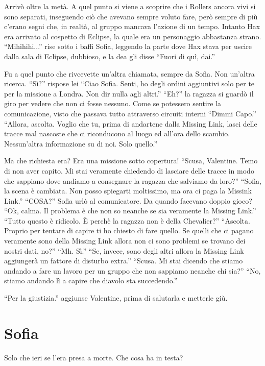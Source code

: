     Arrivò oltre la metà. A quel punto si viene a scoprire che i Rollers ancora vivi si sono separati, inseguendo ciò
    che avevano sempre voluto fare, però sempre di più c'erano segni che, in realtà, al gruppo mancava l'azione di un
    tempo. Intanto Hax era arrivato al cospetto di Eclipse, la quale era un personaggio abbastanza strano.
    ``Mihihihi...'' rise sotto i baffi Sofia, leggendo la parte dove Hax stava per uscire dalla sala di Eclipse,
    dubbioso, e la dea gli disse ``Fuori di quì, dai.''

    Fu a quel punto che rivcevette un'altra chiamata, sempre da Sofia. Non un'altra ricerca. ``Sì?'' rispose lei ``Ciao
    Sofia. Senti, ho degli ordini aggiuntivi solo per te per la missione a Londra. Non dir nulla agli altri.'' ``Eh?''
    la ragazza si guardò il giro per vedere che non ci fosse nessuno. Come se potessero sentire la comunicazione, visto
    che passava tutto attraverso circuiti interni ``Dimmi Capo.'' ``Allora, ascolta. Voglio che tu, prima di andartene
    dalla Missing Link, lasci delle tracce mal nascoste che ci riconducono al luogo ed all'ora dello scambio.
    Nessun'altra informazione su di noi. Solo quello.''

    Ma che richiesta era? Era una missione sotto copertura! ``Scusa, Valentine. Temo di non aver capito. Mi stai
    veramente chiedendo di lasciare delle tracce in modo che sappiano dove andiamo a consegnare la ragazza che salviamo
    da loro?'' ``Sofia, la scena è cambiata. Non posso spiegarti moltissimo, ma ora ci paga la Missink Link.'' ``COSA?''
    Sofia urlò al comunicatore. Da quando facevano doppio gioco? ``Ok, calma. Il problema è che non so neanche se sia
    veramente la Missing Link.'' ``Tutto questo è ridicolo. È perchè la ragazza non è della Chevalier?'' ``Ascolta.
    Proprio per tentare di capire ti ho chiesto di fare quello. Se quelli che ci pagano veramente sono della Missing
    Link allora non ci sono problemi se trovano dei nostri dati, no?'' ``Mh. Sì.'' ``Se, invece, sono degli altri allora
    la Missing Link aggiungerà un fattore di disturbo extra.'' ``Scusa. Mi stai dicendo che stiamo andando a fare un
    lavoro per un gruppo che non sappiamo neanche chi sia?'' ``No, stiamo andando lì a capire che diavolo sta
    succedendo.''

    ``Per la giustizia.'' aggiunse Valentine, prima di salutarla e metterle giù.

  \section*{Sofia}

    Solo che ieri se l'era presa a morte. Che cosa ha in testa?
